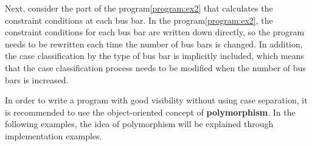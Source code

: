 \documentclass[graybox, envcountchap]{svmult}
\begin{document}
Next, consider the part of the program\nobreak\ref{program:ex2} that calculates the constraint conditions at each bus bar.
In the program\nobreak\ref{program:ex2}, the constraint conditions for each bus bar are written down directly, so the program needs to be rewritten each time the number of bus bars is changed.
In addition, the case classification by the type of bus bar is implicitly included, which means that the case classification process needs to be modified when the number of bus bars is increased.

In order to write a program with good visibility without using case separation, it is recommended to use the object-oriented concept of \textbf{polymorphism}.
In the following examples, the idea of polymorphism will be explained through implementation examples.
\end{document}
